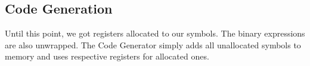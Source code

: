\subsection{Code Generation}
Until this point, we got registers allocated to our symbols. The binary expressions are also unwrapped. The Code Generator simply adds all unallocated symbols to memory and uses respective registers for allocated ones.
